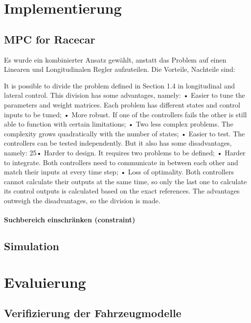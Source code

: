 \documentclass{like}
\begin{document}
\chapter{Implementierung}

\section{MPC for Racecar}

Es wurde ein kombinierter Ansatz gewählt, anstatt das Problem auf einen Linearen und Longitudinalen Regler aufzuteilen. Die Vorteile, Nachteile sind:

It is possible to divide the problem defined in Section 1.4 in longitudinal and lateral control. This division has
some advantages, namely:
• Easier to tune the parameters and weight matrices. Each problem has different states and control inputs to
be tuned;
• More robust. If one of the controllers fails the other is still able to function with certain limitations;
• Two less complex problems. The complexity grows quadratically with the number of states;
• Easier to test. The controllers can be tested independently.
But it also has some disadvantages, namely:
25• Harder to design. It requires two problems to be defined;
• Harder to integrate. Both controllers need to communicate in between each other and match their inputs at
every time step;
• Loss of optimality. Both controllers cannot calculate their outputs at the same time, so only the last one to
calculate its control outputs is calculated based on the exact references.
The advantages outweigh the disadvantages, so the division is made.

\subsubsection{Suchbereich einschränken (constraint)}

\section{Simulation}




\chapter{Evaluierung}

\section{Verifizierung der Fahrzeugmodelle}
\end{document}

